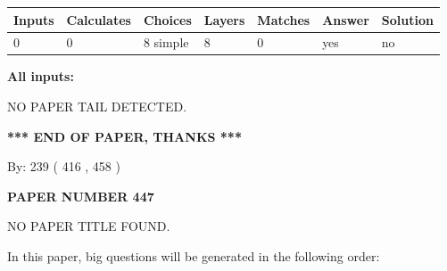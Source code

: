 \documentclass[12pt]{article}
\begin{document}
 
\noindent{}
 
 
   
   
   
   
\noindent\begin{tabular}{|l|l|l|l|l|l|l|}
 \hline
Inputs & Calculates & Choices & Layers & Matches & Answer & Solution \\ \hline
 0  & 
 0  & 
 8
  simple  
  & 
 8  & 
 0  & 
  yes & 
  no 
  \\ \hline
 \end{tabular}
   
   
   
   
\noindent{}
   
   
   
   
\noindent\vspace{0.1in}\hspace{-0.08in} {\textbf{\Large{All inputs: }}}
   
   
   
   
\vspace{2.0in} NO PAPER TAIL DETECTED.
   
   
   
   
\vspace{1.0in} 
{\textbf{\large{ *** END OF PAPER, THANKS *** }}} 
   
   
\hspace{1.0in} By: 
 239 ( 416 ,  458 )
   
   
   
   
\newpage 
\setcounter{page}{ 
   447001 } 
   
   
   
   
 {\textbf{ \Large{ PAPER NUMBER  447  }}}
   
   
\vspace{0.2in}
   
   
   
   
   
   
 NO PAPER TITLE FOUND.
   
   
   
\vspace{0.2in}
   
In this paper, big questions will be generated in the following order: 
   
\end{document}
